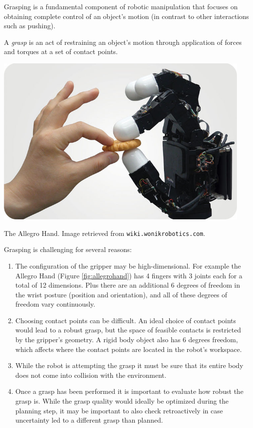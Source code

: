 Grasping is a fundamental component of robotic manipulation that focuses on obtaining complete control of an object's motion (in contrast to other interactions such as pushing). 
\begin{definition}[Grasp]
A \textit{grasp} is an act of restraining an object's motion through application of forces and torques at a set of contact points.
\end{definition}
\begin{marginfigure} 
\begin{center}
\includegraphics[width=0.95\textwidth]{tex/figs/ch26_figs/allegrohand.jpg}
\caption{The Allegro Hand. Image retrieved from \texttt{wiki.wonikrobotics.com}.}
\label{fig:allegrohand}
\end{center}
\end{marginfigure}
Grasping is challenging for several reasons:
\begin{enumerate}
    \item The configuration of the gripper may be high-dimensional. For example the Allegro Hand (Figure \ref{fig:allegrohand}) has 4 fingers with 3 joints each for a total of 12 dimensions. Plus there are an additional 6 degrees of freedom in the wrist posture (position and orientation), and all of these degrees of freedom vary continuously.
    \item Choosing contact points can be difficult. An ideal choice of contact points would lead to a robust grasp, but the space of feasible contacts is restricted by the gripper's geometry. A rigid body object also has 6 degrees freedom, which affects where the contact points are located in the robot's workspace.
    \item While the robot is attempting the grasp it must be sure that its entire body does not come into collision with the environment.
    \item Once a grasp has been performed it is important to evaluate how robust the grasp is. While the grasp quality would ideally be optimized during the planning step, it may be important to also check retroactively in case uncertainty led to a different grasp than planned.
\end{enumerate}

